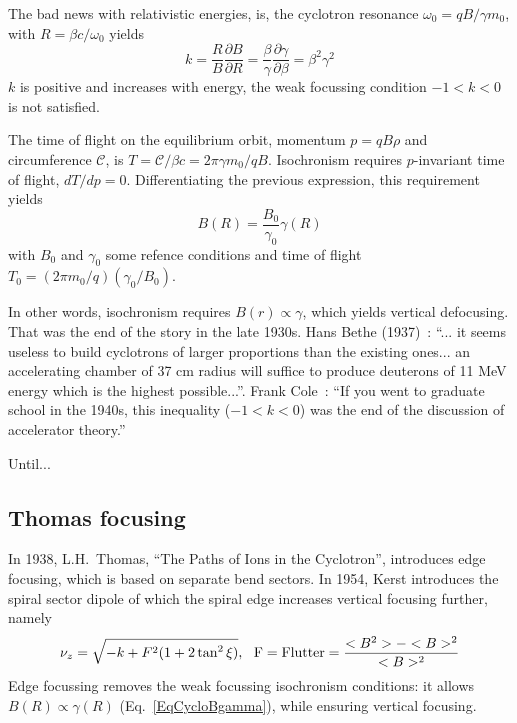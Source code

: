 The bad news with relativistic energies, is, 
the cyclotron resonance $\omega_0 = qB/\gamma m_0$, with $R = \beta c / \omega_0$  yields  
\begin{equation}
\label{EqCycloReson}
  k = \frac{R}{B}\frac{\partial B}{\partial R} = \frac{\beta}{\gamma} 
  \frac{\partial \gamma}{\partial \beta} = \beta^2 \gamma^2 
\end{equation}
$k$ is positive and increases with energy, 
 the weak focussing condition $-1<k<0$ is not satisfied. 

The time of flight on the equilibrium orbit, momentum $p = qB\rho$ and circumference $\mathcal{C}$, is 
$T =  \mathcal{C}/ \beta c = 2\pi \gamma m_0 / qB$. 
    Isochronism requires $p$-invariant time of flight, $dT/dp=0$. Differentiating the previous expression,
this requirement yields 
\begin{equation}
\label{EqCycloBgamma}
B(R) = \frac{B_0}{\gamma_0} \gamma(R)
\end{equation}
with $B_0$ and $\gamma_0$  some refence conditions and time of flight $T_0 = (2\pi m_0/q)(\gamma_0/B_0)$.

In other words, isochronism requires $ B(r) \propto \gamma$, which yields vertical defocusing. 
That was the end of the story in the late 1930s. 
Hans Bethe (1937)~: 
``... it seems useless to build cyclotrons of larger proportions than the  
existing ones... an accelerating chamber of 37 cm radius will  suffice to 
produce deuterons of 11 MeV energy which is the highest possible...''. 
Frank Cole~: ``If you went to graduate school in the 1940s, this inequality ($−1 <
k < 0$) was the end of the discussion of accelerator theory.''

  Until...

\subsection{Thomas focusing}

In 1938, L.H.~Thomas, ``The Paths of Ions in the Cyclotron'', 
introduces  edge focusing, which is based on separate bend sectors. 
In  1954, Kerst introduces the spiral sector dipole of which the spiral edge increases vertical focusing further, namely
\begin{equation}
\label{EqCycloThomasFoc}
\nu_z = \sqrt{-k + F^2(1 + 2 \tan^2 \xi)}, ~ ~ {\rm F=Flutter} = \frac{<B^2> - <B>^2}{<B>^2}
\end{equation}
Edge focussing removes the weak focussing isochronism conditions: it allows  $B(R)\propto\gamma(R)$ 
 (Eq.~\ref{EqCycloBgamma}), while  ensuring vertical focusing.  

